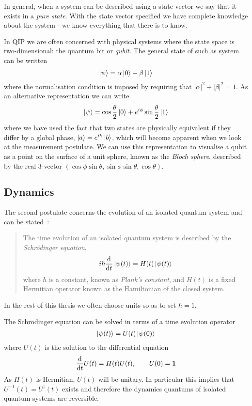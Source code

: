 In general, when a system can be described using a state vector we say that it exists in a \textit{pure state}. With the state vector specified we have complete knowledge about the system - we know everything that there is to know.

In QIP we are often concerned with physical systems where the state space is two-dimensional: the quantum bit or \textit{qubit}. The general state of such as system can be written
\begin{align}
  \left\vert\psi\right\rangle = \alpha\left\vert0\right\rangle + \beta\left\vert1\right\rangle
\end{align}
where the normalisation condition is imposed by requiring that $|\alpha|^2 + |\beta|^2 = 1$. As an alternative representation we can write
\begin{align}
  \left\vert\psi\right\rangle = \cos\frac{\theta}{2}\left\vert0\right\rangle + e^{i\phi}\sin\frac{\theta}{2}\left\vert1\right\rangle
\end{align}
where we have used the fact that two states are physically equivalent if they differ by a global phase, $\left\vert a\right\rangle = e^{ik}\left\vert b\right\rangle$, which will become apparent when we look at the measurement postulate. We can use this representation to visualise a qubit as a point on the surface of a unit sphere, known as the \textit{Bloch sphere}, described by the real $3$-vector $(\cos\phi\sin\theta, \sin\phi\sin\theta, \cos\theta)$.

\subsection{Dynamics}

The second postulate concerns the evolution of an isolated quantum system and can be stated~\cite{nielsen+chuang}:
\begin{quotation}
The time evolution of an isolated quantum system is described by the \textit{Schr\"odinger equation},
\begin{align}
  \label{qd:schrodinger_eq}
  i\hbar\frac{\mathrm{d}}{\mathrm{d}t} \left\vert\psi(t)\right\rangle = H(t) \left\vert\psi(t)\right\rangle
\end{align}
where $\hbar$ is a constant, known as \textit{Plank's constant}, and $H(t)$ is a fixed Hermitian operator known as the Hamiltonian of the closed system.
\end{quotation}
In the rest of this thesis we often choose units so as to set $\hbar = 1$. 

The Schr\"odinger equation can be solved in terms of a time evolution operator
\begin{align}
  \left\vert\psi(t)\right\rangle = U(t)\left\vert\psi(0)\right\rangle
\end{align}
where $U(t)$ is the solution to the differential equation
\begin{align}
  \frac{\mathrm{d}}{\mathrm{d}t} U(t) = H(t)U(t), \qquad U(0) = \mathbf{1}
\end{align}
As $H(t)$ is Hermitian, $U(t)$ will be unitary. In particular this implies that $U^{-1}(t) = U^\dagger(t)$ exists and therefore the dynamics quantums of isolated quantum systems are reversible.

